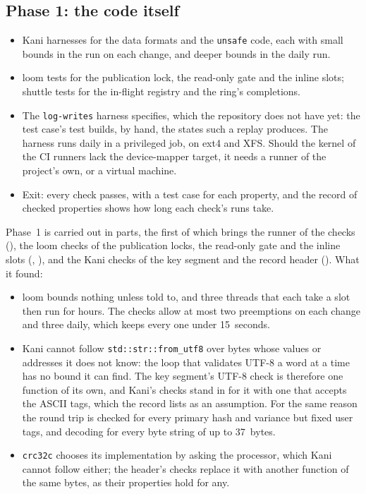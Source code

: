 \subsection*{Phase 1: the code itself}
\begin{itemize}
  \item Kani harnesses for the data formats and the \texttt{unsafe} code,
    each with small bounds in the run on each change, and deeper bounds in
    the daily run.
  \item loom tests for the publication lock, the read-only gate and the
    inline slots; shuttle tests for the in-flight registry and the ring's
    completions.
  \item The \texttt{log-writes} harness 
    specifies, which the repository does not have yet: the test case's test
    builds, by hand, the states such a replay produces. The harness runs
    daily in a privileged job, on ext4 and XFS.
    Should the kernel of the CI runners lack the device-mapper target, it
    needs a runner of the project's own, or a virtual machine.
  \item Exit: every check passes, with a test case for each property, and
    the record of checked properties shows how long each check's runs take.
\end{itemize}
Phase~1 is carried out in parts, the first of which brings the runner of
the checks (), the loom checks of the
publication locks, the read-only gate and the inline slots
(, ),
and the Kani checks of the key segment and the record header
(). What it found:
\begin{itemize}
  \item loom bounds nothing unless told to, and three threads that each take
    a slot then run for hours. The checks allow at most two preemptions on
    each change and three daily, which keeps every one under 15~seconds.
  \item Kani cannot follow \texttt{std::str::from\_utf8} over bytes whose
    values or addresses it does not know: the loop that validates UTF-8 a
    word at a time has no bound it can find. The key segment's UTF-8 check
    is therefore one function of its own, and Kani's checks stand in for it
    with one that accepts the ASCII tags, which the record lists as an
    assumption. For the same reason the round trip is checked for every
    primary hash and variance but fixed user tags, and decoding for every
    byte string of up to 37~bytes.
  \item \texttt{crc32c} chooses its implementation by asking the processor,
    which Kani cannot follow either; the header's checks replace it with
    another function of the same bytes, as their properties hold for any.
\end{itemize}
